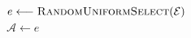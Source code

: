 \begin{algorithm}\footnotesize

\caption{Random Action Selection}\label{algo:random-asm}
\color{dusty_pink}

$e \longleftarrow \textsc{RandomUniformSelect}(\mathcal{E})$\\
$\mathcal{A} \longleftarrow e$ \\

\end{algorithm}